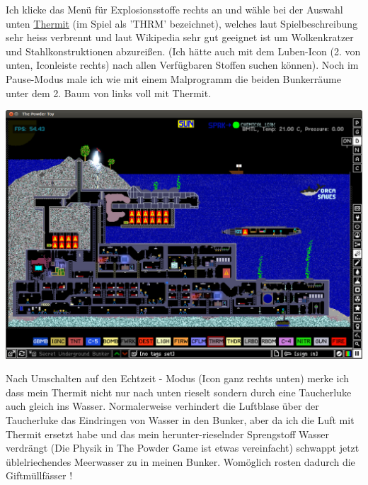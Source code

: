 \documentclass[10pt,a4paper,ngerman,twoside]{article} %
\begin{document}
\begin{multicols}{2}
Ich klicke das Menü für Explosionsstoffe rechts an und wähle bei der Auswahl unten \href{https://de.wikipedia.org/wiki/Thermit}{Thermit} (im Spiel als 'THRM' bezeichnet), welches laut Spielbeschreibung sehr heiss verbrennt und laut Wikipedia sehr gut geeignet ist um Wolkenkratzer und Stahlkonstruktionen abzureißen. (Ich hätte auch mit dem Luben-Icon (2. von unten, Iconleiste rechts) nach allen Verfügbaren Stoffen suchen können). Noch im Pause-Modus male ich wie mit einem Malprogramm die beiden Bunkerräume unter dem 2. Baum von links voll mit Thermit.
\begin{center}
\includegraphics[width=\linewidth]{powdertoy/powdertoy-bu2.png}
\end{center}
Nach Umschalten auf den Echtzeit - Modus (Icon ganz rechts unten) merke ich dass mein Thermit nicht nur nach unten rieselt sondern durch eine Taucherluke auch gleich ins Wasser. Normalerweise verhindert die Luftblase über der Taucherluke das Eindringen von Wasser in den Bunker, aber da ich die Luft mit Thermit ersetzt habe und das mein herunter-rieselnder Sprengstoff Wasser verdrängt (Die Physik in The Powder Game ist etwas vereinfacht) schwappt jetzt üblelriechendes Meerwasser zu in meinen Bunker. Womöglich rosten dadurch die Giftmüllfässer ! 


\end{multicols}
\end{document}
